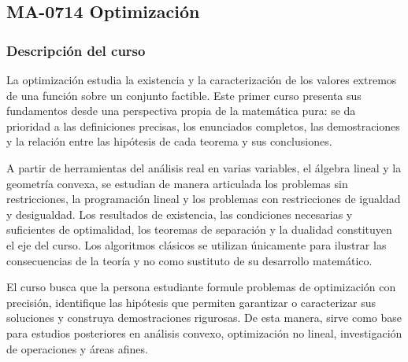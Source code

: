 ﻿%
\newpage
\subsection*{MA-0714 Optimización}
\hypertarget{MA0714}{}
\begin{refsection}
\begin{table}[H]
\end{table}

\subsubsection*{Descripción del curso}

La optimización estudia la existencia y la caracterización de los valores extremos de una función sobre un conjunto factible. Este primer curso presenta sus fundamentos desde una perspectiva propia de la matemática pura: se da prioridad a las definiciones precisas, los enunciados completos, las demostraciones y la relación entre las hipótesis de cada teorema y sus conclusiones.

A partir de herramientas del análisis real en varias variables, el álgebra lineal y la geometría convexa, se estudian de manera articulada los problemas sin restricciones, la programación lineal y los problemas con restricciones de igualdad y desigualdad. Los resultados de existencia, las condiciones necesarias y suficientes de optimalidad, los teoremas de separación y la dualidad constituyen el eje del curso. Los algoritmos clásicos se utilizan únicamente para ilustrar las consecuencias de la teoría y no como sustituto de su desarrollo matemático.

El curso busca que la persona estudiante formule problemas de optimización con precisión, identifique las hipótesis que permiten garantizar o caracterizar sus soluciones y construya demostraciones rigurosas. De esta manera, sirve como base para estudios posteriores en análisis convexo, optimización no lineal, investigación de operaciones y áreas afines.


\end{refsection}
